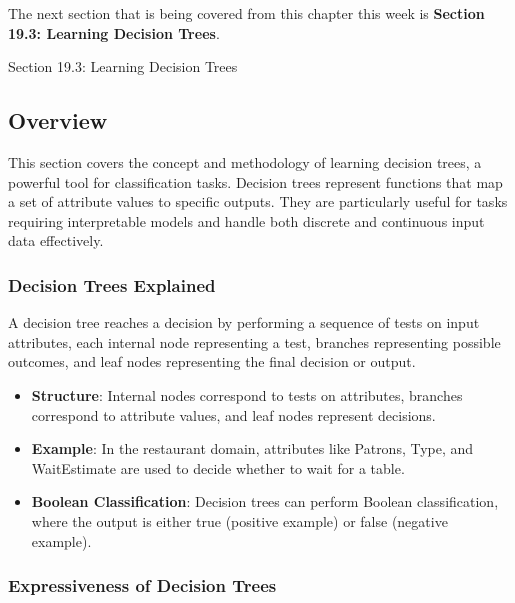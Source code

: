 The next section that is being covered from this chapter this week is \textbf{Section 19.3: Learning Decision Trees}.

\begin{notes}{Section 19.3: Learning Decision Trees}
    \subsection*{Overview}

    This section covers the concept and methodology of learning decision trees, a powerful tool for classification tasks. Decision trees represent functions that map a set of attribute values to specific 
    outputs. They are particularly useful for tasks requiring interpretable models and handle both discrete and continuous input data effectively.
    
    \subsubsection*{Decision Trees Explained}
    
    A decision tree reaches a decision by performing a sequence of tests on input attributes, each internal node representing a test, branches representing possible outcomes, and leaf nodes representing 
    the final decision or output.
    
    \begin{highlight}
    
        \begin{itemize}
            \item \textbf{Structure}: Internal nodes correspond to tests on attributes, branches correspond to attribute values, and leaf nodes represent decisions.
            \item \textbf{Example}: In the restaurant domain, attributes like Patrons, Type, and WaitEstimate are used to decide whether to wait for a table.
            \item \textbf{Boolean Classification}: Decision trees can perform Boolean classification, where the output is either true (positive example) or false (negative example).
        \end{itemize}
    
    \end{highlight}
    
    \subsubsection*{Expressiveness of Decision Trees}
    

\end{notes}
